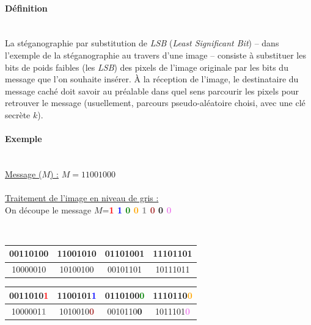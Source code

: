 \paragraph{Définition}~\\\indent
La stéganographie par substitution de \emph{LSB} (\emph{Least Significant Bit}) -- dans l'exemple de la stéganographie au travers d'une image -- consiste à substituer les bits de poids faibles (les \emph{LSB}) des pixels de l'image originale par les bits du message que l'on souhaite insérer. À la réception de l'image, le destinataire du message caché doit savoir au préalable dans quel sens parcourir les pixels pour retrouver le message (usuellement, parcours pseudo-aléatoire choisi, avec une clé secrète $k$).

\paragraph{Exemple}~\\\indent
\underline{Message ($M$) :} $M = 11001000$ ~\\\\\indent
\underline{Traitement de l'image en niveau de gris :} ~\\\indent
On découpe le message $M$=\textbf{\textcolor{red}{1}
						  \textcolor{blue}{1}
						  \textcolor{green}{0}
						  \textcolor{orange}{0}
						  \textcolor{gray}{1}
						  \textcolor{Brown}{0}
						  \textcolor{RubineRed}{0}
						  \textcolor{Violet}{0}}
 
 ~\\

\begin{minipage}{.5\textwidth}\centering
	\begin{tabular}{|c|c|c|c|}
	\hline
	00110100 & 11001010 & 01101001 & 11101101 \\\hline
	10000010 & 10100100 & 00101101 & 10111011 \\\hline
	\end{tabular}
\end{minipage}
\begin{minipage}{.5\textwidth}\centering
	\begin{tabular}{|c|c|c|c|}
	\hline
	0011010\textcolor{red}{\textbf{1}} & 1100101\textcolor{blue}{\textbf{1}} & 0110100\textcolor{green}{\textbf{0}} & 1110110\textcolor{orange}{\textbf{0}} \\\hline
	1000001\textcolor{gray}{\textbf{1}} & 1010010\textcolor{Brown}{\textbf{0}} & 0010110\textcolor{RubineRed}{\textbf{0}} & 1011101\textcolor{Violet}{\textbf{0}} \\\hline
	\end{tabular}
\end{minipage}


